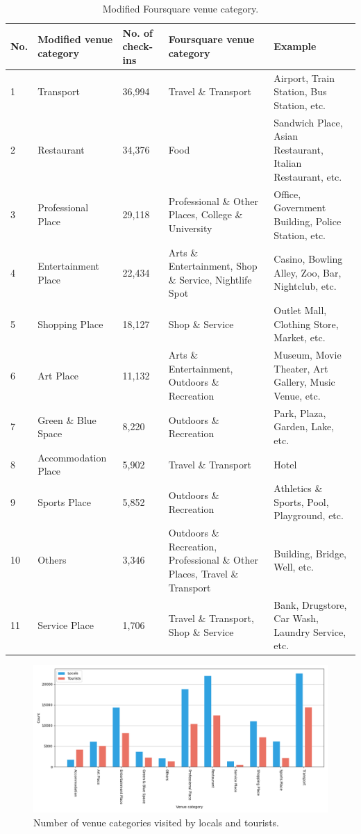 \documentclass{article}
\begin{document}
\begin{table}[h!]
\centering
\caption{\label{tab:modified_category}Modified Foursquare venue category.}
\begin{adjustbox}{max width=\textwidth, margin=0cm}
\begin{tabular}{lllp{6cm}p{5cm}} \hline
No. & Modified venue category & No. of check-ins & Foursquare venue category 
& Example \\ \hline
1 & Transport & 36,994 & Travel \& Transport & Airport, Train Station, Bus Station, etc. \\
2 & Restaurant & 34,376 & Food & Sandwich Place, Asian Restaurant, Italian Restaurant, etc. \\
3 & Professional Place & 29,118 & Professional \& Other Places, College \& University & Office, Government Building, Police Station, etc. \\
4 & Entertainment Place & 22,434 & Arts \& Entertainment, Shop \& Service, Nightlife Spot & Casino, Bowling Alley, Zoo, Bar, Nightclub, etc. \\
5 & Shopping Place & 18,127 & Shop \& Service & Outlet Mall, Clothing Store, Market, etc. \\
6 & Art Place & 11,132 & Arts \& Entertainment, Outdoors \& Recreation & Museum, Movie Theater, Art Gallery, Music Venue, etc. \\
7 & Green \& Blue Space & 8,220 & Outdoors \& Recreation & Park, Plaza, Garden, Lake, etc. \\
8 & Accommodation Place & 5,902 & Travel \& Transport & Hotel \\
9 & Sports Place & 5,852 & Outdoors \& Recreation & Athletics \& Sports, Pool, Playground, etc. \\
10 & Others & 3,346 & Outdoors \& Recreation, Professional \& Other Places, Travel \& Transport & Building, Bridge, Well, etc. \\
11 & Service Place & 1,706 & Travel \& Transport, Shop \& Service & Bank, Drugstore, Car Wash, Laundry Service, etc. \\ \hline
\end{tabular}
\end{adjustbox}
\end{table}


\begin{figure}[h!]
\centering
\includegraphics[width=1\textwidth]{figures/foursquare_category.png}
\caption{\label{fig:foursquare_category}Number of venue categories visited by locals and tourists.}
\end{figure}
\end{document}
